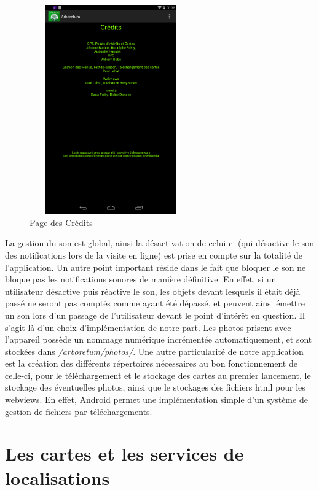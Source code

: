\documentclass[a4paper,11pt]{article}
\begin{document}
    \begin{figure}[H]
     \begin{center}
      \includegraphics[width=7cm,height=9cm]{credit.png}
      \caption{Page des Crédits}
     \end{center}
    \end{figure}
		La gestion du son est global, ainsi la désactivation de celui-ci (qui désactive le son des notifications lors de la visite en ligne) est prise en compte sur la totalité de l'application. 
		Un autre point important réside dans le fait que bloquer le son ne bloque pas les notifications sonores de manière définitive. En effet, si un utilisateur désactive puis réactive le son, 
		les objets devant lesquels il était déjà passé ne seront pas comptés comme ayant été dépassé, et peuvent ainsi émettre un son lors d'un passage de l'utilisateur devant le point d’intérêt en question. 
		Il s'agit là d'un choix d'implémentation de notre part.
		Les photos prisent avec l'appareil possède un nommage numérique incrémentée automatiquement, et sont stockées dans \emph{/arboretum/photos/}. 
		Une autre particularité de notre application est la création des différents répertoires nécessaires au bon fonctionnement de 
		celle-ci, pour le téléchargement et le stockage des cartes au premier lancement, le stockage des éventuelles photos, ainsi que le stockages des fichiers html pour les webviews.
		En effet, Android permet une implémentation simple d'un système de gestion de fichiers par téléchargements. %
		
		\section{Les cartes et les services de localisations}
		  
\end{document}
